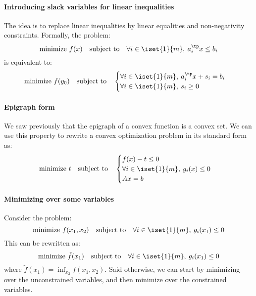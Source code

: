 \paragraph*{Introducing slack variables for linear inequalities}
The idea is to replace linear inequalities by linear equalities and non-negativity constraints.
Formally, the problem:
\begin{equation*}
    \text{minimize } f(x) \quad\text{subject to}\quad \forall i\in\iset{1}{m}, \: a_i^\tp x\leq b_i
\end{equation*}
is equivalent to:
\begin{equation*}
    \text{minimize } f(y_0) \quad\text{subject to}\quad \begin{cases}
        \forall i\in\iset{1}{m}, \: a_i^\tp x + s_i = b_i\\
        \forall i\in\iset{1}{m}, \: s_i\geq0
    \end{cases}
\end{equation*}

\paragraph*{Epigraph form}
We saw previously that the epigraph of a convex function is a convex set. We can use this property to rewrite a convex optimization problem in its standard form as:
\begin{equation*}
    \text{minimize } t \quad\text{subject to}\quad \begin{cases}
        f(x)-t\leq0\\
        \forall i\in\iset{1}{m}, \: g_i(x)\leq 0\\
        Ax=b
    \end{cases}
\end{equation*}

\paragraph*{Minimizing over some variables}
Consider the problem:
\begin{equation*}
    \text{minimize } f(x_1, x_2) \quad\text{subject to}\quad \forall i\in\iset{1}{m}, \: g_i(x_1)\leq 0
\end{equation*}
This can be rewritten as:
\begin{equation*}
    \text{minimize } \tilde{f}(x_1) \quad\text{subject to}\quad \forall i\in\iset{1}{m}, \: g_i(x_1)\leq 0\\
\end{equation*}
where $\tilde{f}(x_1)=\inf_{x_2}f(x_1, x_2)$. Said otherwise, we can start by minimizing over the unconstrained variables, and then minimize over the constrained variables.

